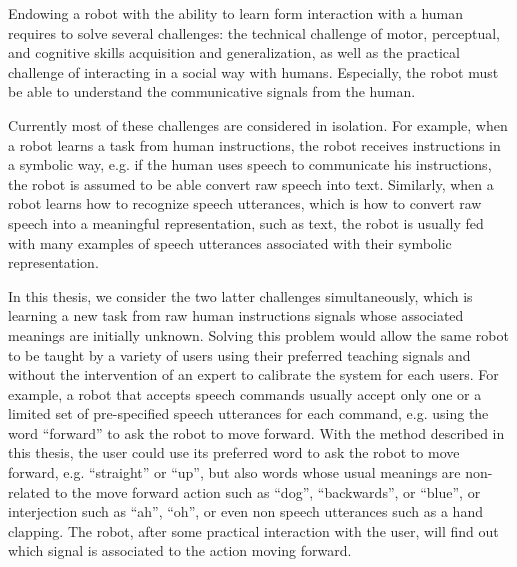 Endowing a robot with the ability to learn form interaction with a human requires to solve several challenges: the technical challenge of motor, perceptual, and cognitive skills acquisition and generalization, as well as the practical challenge of interacting in a social way with humans.
Especially, the robot must be able to understand the communicative signals from the human.


Currently most of these challenges are considered in isolation. For example, when a robot learns a task from human instructions, the robot receives instructions in a symbolic way, e.g. if the human uses speech to communicate his instructions, the robot is assumed to be able convert raw speech into text. Similarly, when a robot learns how to recognize speech utterances, which is how to convert raw speech into a meaningful representation, such as text, the robot is usually fed with many examples of speech utterances associated with their symbolic representation.

In this thesis, we consider the two latter challenges simultaneously, which is learning a new task from raw human instructions signals whose associated meanings are initially unknown. Solving this problem would allow the same robot to be taught by a variety of users using their preferred teaching signals and without the intervention of an expert to calibrate the system 
for each users. For example, a robot that accepts speech commands usually accept only one or a limited set of pre-specified speech utterances for each command, e.g. using the word ``forward'' to ask the robot to move forward. With the method described in this thesis, the user could use its preferred word to ask the robot to move forward, e.g. ``straight'' or ``up'', but also words whose usual meanings are non-related to the move forward action such as ``dog'', ``backwards'', or ``blue'', or interjection such as ``ah'', ``oh'', or even non speech utterances such as a hand clapping. The robot, after some practical interaction with the user, will find out which signal is associated to the action moving forward.


